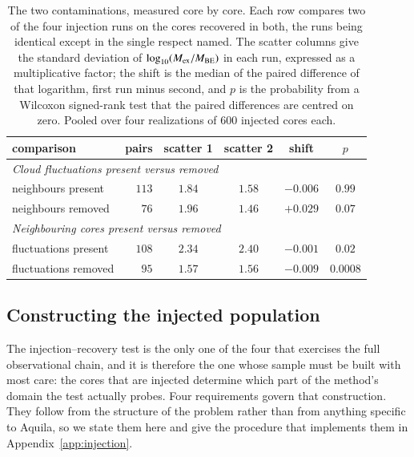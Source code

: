 \documentclass{aa}
\newcommand{\Mex}{M_{\rm ex}}
\newcommand{\Mbe}{M_{\rm BE}}
\begin{document}
\begin{table}
\caption{The two contaminations, measured core by core. Each row compares two
of the four injection runs on the cores recovered in both, the runs being
identical except in the single respect named. The scatter columns give the
standard deviation of $\log_{10}(\Mex/\Mbe)$ in each run, expressed as a
multiplicative factor; the shift is the median of the paired difference of that
logarithm, first run minus second, and $p$ is the probability from a Wilcoxon
signed-rank test that the paired differences are centred on zero. Pooled over
four realizations of $600$ injected cores each.}
\label{tab:contamination}
\centering
\begin{tabular}{lrcccc}
\hline\hline
comparison & pairs & scatter 1 & scatter 2 & shift & $p$ \\
\hline
\multicolumn{6}{l}{\emph{Cloud fluctuations present versus removed}} \\
neighbours present & $113$ & $1.84$ & $1.58$ & $-0.006$ & $0.99$ \\
neighbours removed & $76$  & $1.96$ & $1.46$ & $+0.029$ & $0.07$ \\
\hline
\multicolumn{6}{l}{\emph{Neighbouring cores present versus removed}} \\
fluctuations present & $108$ & $2.34$ & $2.40$ & $-0.001$ & $0.02$ \\
fluctuations removed & $95$  & $1.57$ & $1.56$ & $-0.009$ & $0.0008$ \\
\hline
\end{tabular}
\end{table}


\subsection{Constructing the injected population}
\label{sec:injpop}

The injection--recovery test is the only one of the four that exercises the
full observational chain, and it is therefore the one whose sample must be
built with most care: the cores that are injected determine which part of the
method's domain the test actually probes. Four requirements govern that
construction. They follow from the structure of the problem rather than from
anything specific to Aquila, so we state them here and give the procedure that
implements them in Appendix~\ref{app:injection}.
\end{document}
